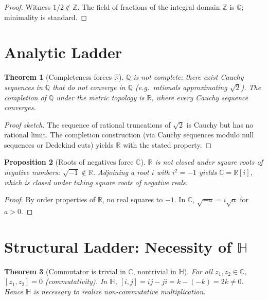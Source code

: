 \documentclass[12pt,a4paper]{article}
\newtheorem{theorem}{Theorem}
\newtheorem{proposition}[theorem]{Proposition}
\theoremstyle{definition}
\theoremstyle{remark}
\begin{document}
\begin{proof}
Witness $1/2\notin\mathbb{Z}$. The field of fractions of the integral domain $\mathbb{Z}$ is $\mathbb{Q}$; minimality is standard.
\end{proof}

\section{Analytic Ladder}
\begin{theorem}[Completeness forces $\mathbb{R}$]
\label{thm:Rcomplete}
$\mathbb{Q}$ is not complete: there exist Cauchy sequences in $\mathbb{Q}$ that do not converge in $\mathbb{Q}$ (e.g.\ rationals approximating $\sqrt{2}$). The completion of $\mathbb{Q}$ under the metric topology is $\mathbb{R}$, where every Cauchy sequence converges.
\end{theorem}

\begin{proof}[Proof sketch]
The sequence of rational truncations of $\sqrt{2}$ is Cauchy but has no rational limit. The completion construction (via Cauchy sequences modulo null sequences or Dedekind cuts) yields $\mathbb{R}$ with the stated property.
\end{proof}

\begin{proposition}[Roots of negatives force $\mathbb{C}$]
\label{prop:Crootneg}
$\mathbb{R}$ is not closed under square roots of negative numbers: $\sqrt{-1}\notin\mathbb{R}$. Adjoining a root $i$ with $i^2=-1$ yields $\mathbb{C}=\mathbb{R}[i]$, which is closed under taking square roots of negative reals.
\end{proposition}

\begin{proof}
By order properties of $\mathbb{R}$, no real squares to $-1$. In $\mathbb{C}$, $\sqrt{-a}=i\sqrt{a}$ for $a>0$.
\end{proof}

\section{Structural Ladder: Necessity of $\mathbb{H}$}
\begin{theorem}[Commutator is trivial in $\mathbb{C}$, nontrivial in $\mathbb{H}$]
\label{thm:Hnecessary}
For all $z_1,z_2\in\mathbb{C}$, $[z_1,z_2]=0$ (commutativity). In $\mathbb{H}$, $[i,j]=ij-ji=k-(-k)=2k\neq 0$. Hence $\mathbb{H}$ is necessary to realize non-commutative multiplication.
\end{theorem}
\end{document}
